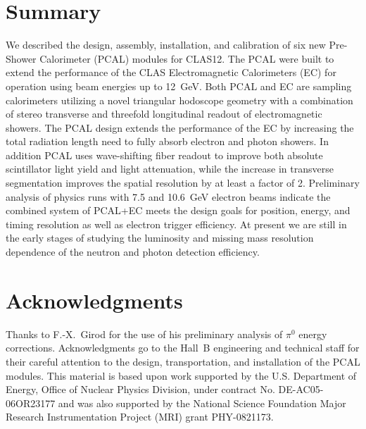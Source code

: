 \section{Summary}

We described the design, assembly, installation, and calibration of six new Pre-Shower Calorimeter (PCAL) modules
for CLAS12. The PCAL were built to extend the performance of the CLAS Electromagnetic Calorimeters (EC) for
operation using beam energies up to 12~GeV. Both PCAL and EC are sampling calorimeters utilizing a novel triangular
hodoscope geometry with a combination of stereo transverse and threefold longitudinal readout of electromagnetic
showers. The PCAL design extends the performance of the EC by increasing the total radiation length need to fully
absorb electron and photon showers.  In addition PCAL uses wave-shifting fiber readout to improve both absolute
scintillator light yield and light attenuation, while the increase in transverse segmentation improves the spatial
resolution by at least a factor of 2. Preliminary analysis of physics runs with 7.5 and 10.6~GeV electron beams
indicate the combined system of PCAL+EC meets the design goals for position, energy, and timing resolution as well
as electron trigger efficiency. At present we are still in the early
stages of studying the luminosity and missing mass resolution dependence of the neutron and photon detection efficiency.

\section*{Acknowledgments}

Thanks to F.-X.~Girod for the use of his preliminary analysis of $\pi^0$ energy corrections. Acknowledgments go to 
the Hall~B engineering and technical staff for their
careful attention to the design, transportation, and installation of the PCAL modules. This material is based upon
work supported by the U.S. Department of Energy, Office of Nuclear Physics Division, under contract No.
DE-AC05-06OR23177 and was also supported by the National Science Foundation Major Research Instrumentation
Project (MRI) grant PHY-0821173.






